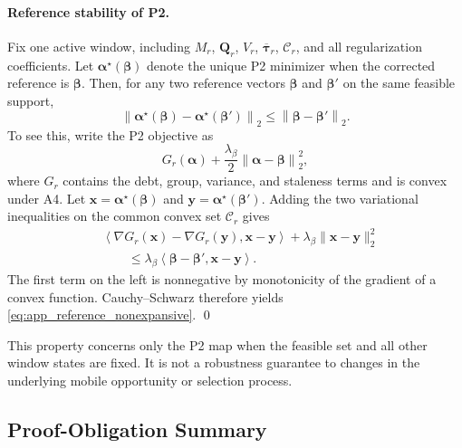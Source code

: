 \paragraph{Reference stability of P2.}
Fix one active window, including $M_r$, $\mathbf Q_r$, $V_r$,
$\overline{\boldsymbol\tau}_r$, $\mathcal C_r$, and all regularization
coefficients.  Let $\boldsymbol\alpha^\star(\boldsymbol\beta)$ denote the
unique P2 minimizer when the corrected reference is
$\boldsymbol\beta$.  Then, for any two reference vectors
$\boldsymbol\beta$ and $\boldsymbol\beta'$ on the same feasible support,
\begin{equation}
 \left\|
 \boldsymbol\alpha^\star(\boldsymbol\beta)
 -
 \boldsymbol\alpha^\star(\boldsymbol\beta')
 \right\|_2
 \le
 \left\|
 \boldsymbol\beta-\boldsymbol\beta'
 \right\|_2.
 \label{eq:app_reference_nonexpansive}
\end{equation}
To see this, write the P2 objective as
\begin{equation}
 G_r(\boldsymbol\alpha)
 +\frac{\lambda_\beta}{2}
 \left\|
 \boldsymbol\alpha-\boldsymbol\beta
 \right\|_2^2,
 \label{eq:app_p2_split}
\end{equation}
where $G_r$ contains the debt, group, variance, and staleness terms and is
convex under A4.  Let
$\mathbf x=\boldsymbol\alpha^\star(\boldsymbol\beta)$ and
$\mathbf y=\boldsymbol\alpha^\star(\boldsymbol\beta')$.  Adding the two
variational inequalities on the common convex set $\mathcal C_r$ gives
\begin{align}
 &\left\langle
 \nabla G_r(\mathbf x)-\nabla G_r(\mathbf y),
 \mathbf x-\mathbf y
 \right\rangle
 +\lambda_\beta\|\mathbf x-\mathbf y\|_2^2
 \nonumber\\
 &\qquad\le
 \lambda_\beta
 \left\langle
 \boldsymbol\beta-\boldsymbol\beta',
 \mathbf x-\mathbf y
 \right\rangle.
 \label{eq:app_reference_vi}
\end{align}
The first term on the left is nonnegative by monotonicity of the gradient of a
convex function.  Cauchy--Schwarz therefore yields
\eqref{eq:app_reference_nonexpansive}.
\qed

This property concerns only the P2 map
when the feasible set and all other window states are fixed.  It is not a
robustness guarantee to changes in the underlying mobile opportunity or
selection process.

\subsection{Proof-Obligation Summary}
\label{app:proof_summary}

